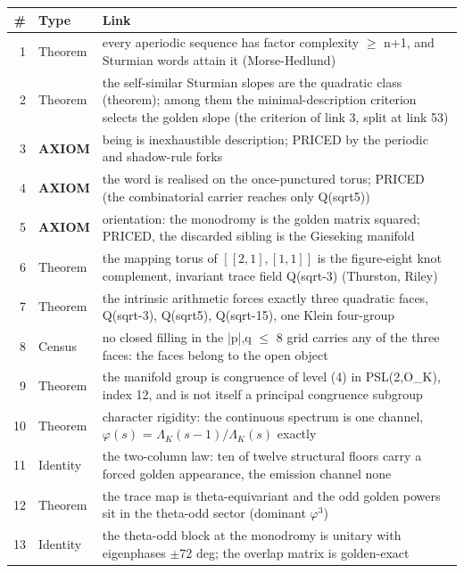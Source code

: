 \documentclass[11pt,a4paper]{article}
\theoremstyle{definition}
\theoremstyle{remark}
\begin{document}
\begingroup\footnotesize
\setlength{\LTleft}{0pt}\setlength{\LTright}{0pt}
\begin{longtable}{@{}r l p{8.2cm}@{}}
\textbf{\#} & \textbf{Type} & \textbf{Link} \\ \midrule \endhead
1 & Theorem & every aperiodic sequence has factor complexity $\ge$ n+1, and Sturmian words attain it (Morse-Hedlund) \\
2 & Theorem & the self-similar Sturmian slopes are the quadratic class (theorem); among them the minimal-description criterion selects the golden slope (the criterion of link 3, split at link 53) \\
3 & \textbf{AXIOM} & being is inexhaustible description; PRICED by the periodic and shadow-rule forks \\
4 & \textbf{AXIOM} & the word is realised on the once-punctured torus; PRICED (the combinatorial carrier reaches only Q(sqrt5)) \\
5 & \textbf{AXIOM} & orientation: the monodromy is the golden matrix squared; PRICED, the discarded sibling is the Gieseking manifold \\
6 & Theorem & the mapping torus of $[[2,1],[1,1]]$ is the figure-eight knot complement, invariant trace field Q(sqrt-3) (Thurston, Riley) \\
7 & Theorem & the intrinsic arithmetic forces exactly three quadratic faces, Q(sqrt-3), Q(sqrt5), Q(sqrt-15), one Klein four-group \\
8 & Census & no closed filling in the |p|,q $\le$ 8 grid carries any of the three faces: the faces belong to the open object \\
9 & Theorem & the manifold group is congruence of level (4) in PSL(2,O\_K), index 12, and is not itself a principal congruence subgroup \\
10 & Theorem & character rigidity: the continuous spectrum is one channel, $\varphi(s)$ = $\Lambda_K(s-1)/\Lambda_K(s)$ exactly \\
11 & Identity & the two-column law: ten of twelve structural floors carry a forced golden appearance, the emission channel none \\
12 & Theorem & the trace map is theta-equivariant and the odd golden powers sit in the theta-odd sector (dominant $\varphi^3$) \\
13 & Identity & the theta-odd block at the monodromy is unitary with eigenphases $\pm$72 deg; the overlap matrix is golden-exact \\

\end{longtable}
\end{document}
